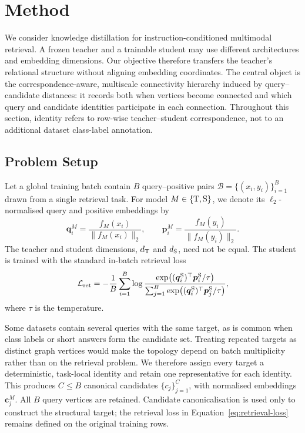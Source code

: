 \section{Method}
\label{sec:method}

We consider knowledge distillation for instruction-conditioned multimodal
retrieval. A frozen teacher and a trainable student may use different
architectures and embedding dimensions. Our objective therefore transfers the
teacher's relational structure without aligning embedding coordinates. The
central object is the correspondence-aware, multiscale connectivity hierarchy
induced by query--candidate distances: it records both when vertices become
connected and which query and candidate identities participate in each
connection. Throughout this section, identity refers to row-wise
teacher--student correspondence, not to an additional dataset class-label
annotation.

\subsection{Problem Setup}
\label{sec:method-setup}

Let a global training batch contain $B$ query--positive pairs
$\mathcal{B}=\{(x_i,y_i)\}_{i=1}^{B}$ drawn from a single retrieval task. For
model $M\in\{\mathrm{T},\mathrm{S}\}$, we denote its $\ell_2$-normalised query and
positive embeddings by
\begin{equation}
    \bm{q}^{M}_i
    = \frac{f_M(x_i)}{\lVert f_M(x_i)\rVert_2},
    \qquad
    \bm{p}^{M}_i
    = \frac{f_M(y_i)}{\lVert f_M(y_i)\rVert_2}.
    \label{eq:normalised-embeddings}
\end{equation}
The teacher and student dimensions, $d_{\mathrm{T}}$ and $d_{\mathrm{S}}$, need
not be equal. The student is trained with the standard in-batch retrieval loss
\begin{equation}
    \mathcal{L}_{\mathrm{ret}}
    = -\frac{1}{B}\sum_{i=1}^{B}
    \log
    \frac{
        \exp\!\left((\bm{q}^{\mathrm{S}}_i)^{\top}
        \bm{p}^{\mathrm{S}}_i / \tau\right)
    }{
        \sum_{j=1}^{B}
        \exp\!\left((\bm{q}^{\mathrm{S}}_i)^{\top}
        \bm{p}^{\mathrm{S}}_j / \tau\right)
    },
    \label{eq:retrieval-loss}
\end{equation}
where $\tau$ is the temperature.

Some datasets contain several queries with the same target, as is common when
class labels or short answers form the candidate set. Treating repeated
targets as distinct graph vertices would make the topology depend on batch
multiplicity rather than on the retrieval problem. We therefore assign every
target a deterministic, task-local identity and retain one representative for
each identity. This produces $C\leq B$ canonical candidates
$\{c_j\}_{j=1}^{C}$, with normalised embeddings $\bm{c}^M_j$. All $B$ query
vertices are retained. Candidate
canonicalisation is used only to construct the structural target; the
retrieval loss in Equation~\eqref{eq:retrieval-loss} remains defined on the
original training rows.


